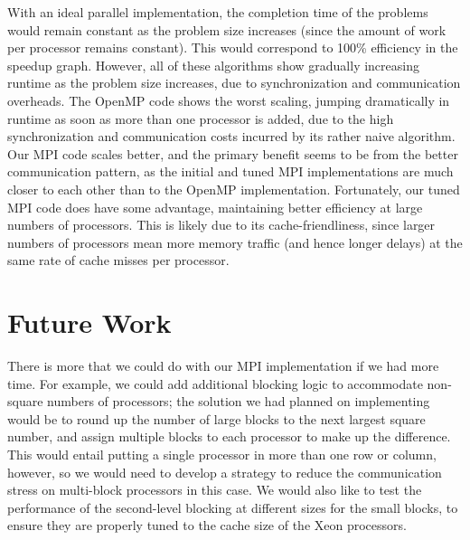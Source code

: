 \documentclass[11pt]{article}
\begin{document}
With an ideal parallel implementation, the completion time of the problems would remain constant as the problem size increases (since the amount of work per processor remains constant).
This would correspond to 100\% efficiency in the speedup graph.
However, all of these algorithms show gradually increasing runtime as the problem size increases, due to synchronization and communication overheads.
The OpenMP code shows the worst scaling, jumping dramatically in runtime as soon as more than one processor is added, due to the high synchronization and communication costs incurred by its rather naive algorithm.
Our MPI code scales better, and the primary benefit seems to be from the better communication pattern, as the initial and tuned MPI implementations are much closer to each other than to the OpenMP implementation.
Fortunately, our tuned MPI code does have some advantage, maintaining better efficiency at large numbers of processors.
This is likely due to its cache-friendliness, since larger numbers of processors mean more memory traffic (and hence longer delays) at the same rate of cache misses per processor.

\section{Future Work}
There is more that we could do with our MPI implementation if we had more time. 
For example, we could add additional blocking logic to accommodate non-square numbers of processors; the solution we had planned on implementing would be to round up the number of large blocks to the next largest square number, and assign multiple blocks to each processor to make up the difference.
This would entail putting a single processor in more than one row or column, however, so we would need to develop a strategy to reduce the communication stress on multi-block processors in this case.
We would also like to test the performance of the second-level blocking at different sizes for the small blocks, to ensure they are properly tuned to the cache size of the Xeon processors.
\end{document}
